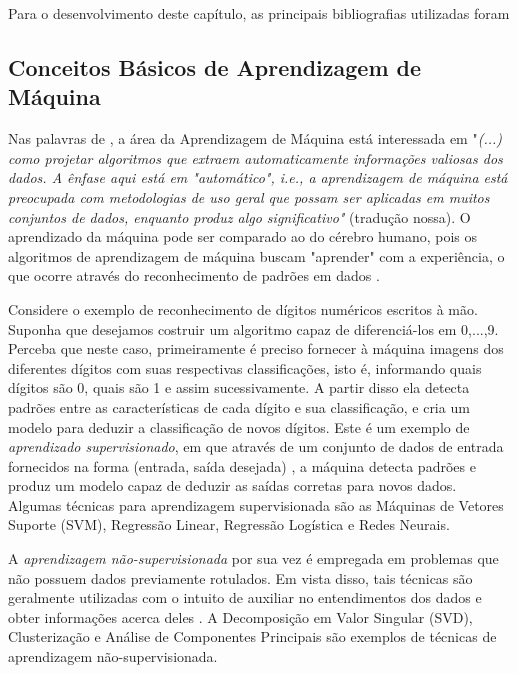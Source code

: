 \documentclass[12pt,a4paper]{scrartcl}
\theoremstyle{definition}%
\begin{document}
Para o desenvolvimento deste capítulo, as principais bibliografias utilizadas foram \textcite{Faisal2019,Evelin2017}


\subsection{Conceitos Básicos de Aprendizagem de Máquina}

Nas palavras de \textcite[p. 11]{Faisal2019}, a área da Aprendizagem de Máquina está interessada em "\textit{(...) como projetar algoritmos que extraem automaticamente informações valiosas dos dados. A ênfase aqui está em "automático", i.e., a aprendizagem de máquina está preocupada com metodologias de uso geral que possam ser aplicadas em muitos conjuntos de dados, enquanto produz algo significativo"} (tradução nossa). O aprendizado da máquina pode ser comparado ao do cérebro humano, pois os algoritmos de aprendizagem de máquina buscam "aprender" com a experiência, o que ocorre através do reconhecimento de padrões em dados \cite{Evelin2017}. 

Considere o exemplo de reconhecimento de dígitos numéricos escritos à mão. Suponha que desejamos costruir um algoritmo capaz de diferenciá-los em 0,...,9. Perceba que neste caso, primeiramente é preciso fornecer à máquina imagens dos diferentes dígitos com suas respectivas classificações, isto é, informando quais dígitos são 0, quais são 1 e assim sucessivamente. A partir disso ela detecta padrões entre as características de cada dígito e sua classificação, e cria um modelo para deduzir a classificação de novos dígitos. Este é um exemplo de \emph{aprendizado supervisionado}, em que através de um conjunto de dados de entrada fornecidos na forma (entrada, saída desejada) \cite{Lorena&Carvalho}, a máquina detecta padrões e produz um modelo capaz de deduzir as saídas corretas para novos dados. Algumas técnicas para aprendizagem supervisionada são as Máquinas de Vetores Suporte (SVM), Regressão Linear, Regressão Logística e Redes Neurais.

A \emph{aprendizagem não-supervisionada} por sua vez é empregada em problemas que não possuem dados previamente rotulados. Em vista disso, tais técnicas são geralmente utilizadas com o intuito de auxiliar no entendimentos dos dados e obter informações acerca deles \cite{Lorena&Carvalho}. A Decomposição em Valor Singular (SVD), Clusterização e Análise de Componentes Principais \cite{Evelin2017} são exemplos de técnicas de aprendizagem não-supervisionada. 
\end{document}
